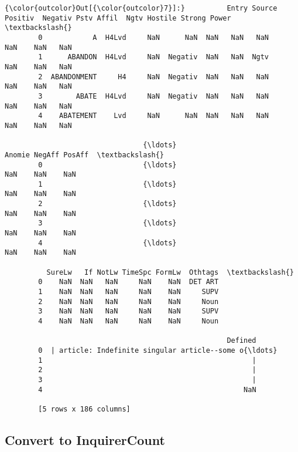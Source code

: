 \documentclass[11pt]{article}
\begin{document}
\begin{Verbatim}[commandchars=\\\{\}]
{\color{outcolor}Out[{\color{outcolor}7}]:}          Entry Source Positiv  Negativ Pstv Affil  Ngtv Hostile Strong Power  \textbackslash{}
        0            A  H4Lvd     NaN      NaN  NaN   NaN   NaN     NaN    NaN   NaN   
        1      ABANDON  H4Lvd     NaN  Negativ  NaN   NaN  Ngtv     NaN    NaN   NaN   
        2  ABANDONMENT     H4     NaN  Negativ  NaN   NaN   NaN     NaN    NaN   NaN   
        3        ABATE  H4Lvd     NaN  Negativ  NaN   NaN   NaN     NaN    NaN   NaN   
        4    ABATEMENT    Lvd     NaN      NaN  NaN   NaN   NaN     NaN    NaN   NaN   
        
                                 {\ldots}                         Anomie NegAff PosAff  \textbackslash{}
        0                        {\ldots}                            NaN    NaN    NaN   
        1                        {\ldots}                            NaN    NaN    NaN   
        2                        {\ldots}                            NaN    NaN    NaN   
        3                        {\ldots}                            NaN    NaN    NaN   
        4                        {\ldots}                            NaN    NaN    NaN   
        
          SureLw   If NotLw TimeSpc FormLw  Othtags  \textbackslash{}
        0    NaN  NaN   NaN     NaN    NaN  DET ART   
        1    NaN  NaN   NaN     NaN    NaN     SUPV   
        2    NaN  NaN   NaN     NaN    NaN     Noun   
        3    NaN  NaN   NaN     NaN    NaN     SUPV   
        4    NaN  NaN   NaN     NaN    NaN     Noun   
        
                                                     Defined  
        0  | article: Indefinite singular article--some o{\ldots}  
        1                                                  |  
        2                                                  |  
        3                                                  |  
        4                                                NaN  
        
        [5 rows x 186 columns]
\end{Verbatim}
            
    \subsection{Convert to InquirerCount}\label{convert-to-inquirercount}
\end{document}
